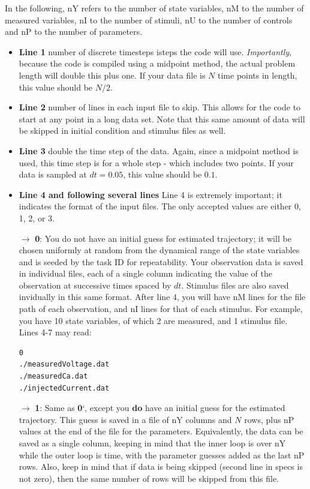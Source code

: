 \documentclass[11pt]{article}
\begin{document}
{  In the following, nY refers to the number of state variables, nM to the number of measured variables, nI to the number of stimuli, nU to the number of controls and nP to the number of parameters.

\begin{itemize}

\item {\bf Line 1} number of discrete timesteps isteps the code will use.  {\it Importantly}, because the code is compiled using a midpoint method, the actual problem length will double this plus one. If your data file is $N$ time points in length, this value should be $N/2$.
\item {\bf Line 2} number of lines in each input file to skip.  This allows for the code to start at any point in a long data set. Note that this same amount of data will be skipped in initial condition and stimulus files as well.
\item {\bf Line 3} double the time step of the data. Again, since a midpoint method is used, this time step is for a whole step - which includes two points. If your data is sampled at $dt = 0.05$, this value should be $0.1$.
\item {\bf Line 4 and following several lines} Line 4 is extremely important; it indicates the format of the input files. The only accepted values are  either 0, 1, 2, or 3. 


\item[$\rightarrow$] {\bf 0}: You do not have an initial guess for estimated trajectory; it will be chosen uniformly at random from the dynamical range of the state variables and is seeded by the task ID for repeatability. Your observation data is saved in individual files, each of a single column indicating the value of the observation at successive times spaced by $dt$. Stimulus files are also saved invidually in this same format. After line 4, you will have nM lines for the file path of each observation, and nI lines for that of each stimulus. For example, you have 10 state variables, of which 2 are measured, and 1 stimulus file. Lines 4-7 may read:

\begin{verbatim}
0
./measuredVoltage.dat
./measuredCa.dat
./injectedCurrent.dat
\end{verbatim}

\item[$\rightarrow$] {\bf 1}: Same as {\bf 0}`, except you {\bf do} have an initial guess for the estimated trajectory. This guess is saved in a file of nY columns and $N$ rows, plus nP values at the end of the file for the parameters. Equivalently, the data can be saved as a single column, keeping in mind that the inner loop is over nY while the outer loop is time, with the parameter guesses added as the last nP rows. Also, keep in mind that if data is being skipped (second line in specs is not zero), then the same number of rows will be skipped from this file. 


\end{itemize}}
\end{document}
